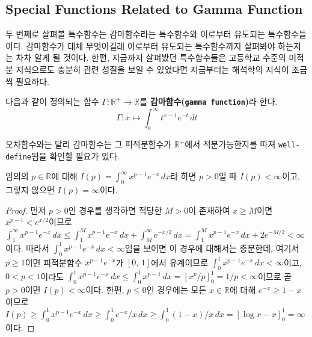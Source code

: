 \subsection{Special Functions Related to Gamma Function}

두 번째로 살펴볼 특수함수는 감마함수라는 특수함수와 이로부터 유도되는 특수함수들이다. 감마함수가 대체 무엇이길래 이로부터 유도되는 특수함수까지 살펴봐야 하는지는 차차 알게 될 것이다. 한편, 지금까지 살펴봤던 특수함수들은 고등학교 수준의 미적분 지식으로도 충분히 관련 성질을 보일 수 있었다면 지금부터는 해석학의 지식이 조금씩 필요하다.

\begin{definition}
    다음과 같이 정의되는 함수 $\Gamma:\mathbb{R}^+\to\mathbb{R}$를 \textbf{감마함수(\texttt{gamma function})}라 한다.
    \begin{equation*}
        \Gamma:x\mapsto\int_0^\infty t^{x-1}e^{-t}\,dt
    \end{equation*}
\end{definition}

오차함수와는 달리 감마함수는 그 피적분함수가 $\mathbb{R}^+$에서 적분가능한지를 따져 \texttt{well-define}됨을 확인할 필요가 있다.

\begin{proposition}
    임의의 $p\in\mathbb{R}$에 대해 $I(p)=\int_0^\infty x^{p-1}e^{-x}\,dx$라 하면 $p>0$일 때 $I(p)<\infty$이고, 그렇지 않으면 $I(p)=\infty$이다.
\end{proposition}

\begin{proof}
    먼저 $p>0$인 경우를 생각하면 적당한 $M>0$이 존재하여 $x\geq M$이면 $x^{p-1}<e^{x/2}$이므로 $\int_1^\infty x^{p-1}e^{-x}\,dx\leq\int_1^Mx^{p-1}e^{-x}\,dx+\int_M^\infty e^{-x/2}\,dx=\int_1^Mx^{p-1}e^{-x}\,dx+2e^{-M/2}<\infty$이다. 따라서 $\int_0^1x^{p-1}e^{-x}\,dx<\infty$임을 보이면 이 경우에 대해서는 충분한데, 여기서 $p\geq1$이면 피적분함수 $x^{p-1}e^{-x}$가 $[0,\,1]$에서 유계이므로 $\int_0^1x^{p-1}e^{-x}\,dx<\infty$이고, $0<p<1$이라도 $\int_0^1x^{p-1}e^{-x}\,dx\leq\int_0^1x^{p-1}\,dx=[x^p/p]_0^1=1/p<\infty$이므로 곧 $p>0$이면 $I(p)<\infty$이다. 한편, $p\leq0$인 경우에는 모든 $x\in\mathbb{R}$에 대해 $e^{-x}\geq1-x$이므로 $I(p)\geq\int_0^1x^{p-1}e^{-x}\,dx\geq\int_0^1e^{-x}/x\,dx\geq\int_0^1(1-x)/x\,dx=[\log x-x]_0^1=\infty$이다.
\end{proof}

